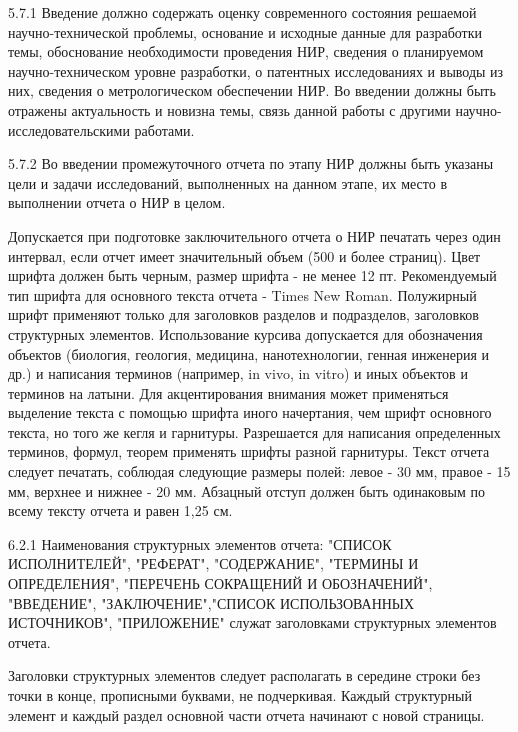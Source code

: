 



\tableofcontents


5.7.1 Введение должно содержать оценку современного состояния решаемой
научно-технической проблемы, основание и исходные данные для разработки темы,
обоснование необходимости проведения НИР, сведения о планируемом
научно-техническом уровне разработки, о патентных исследованиях и выводы из
них, сведения о метрологическом обеспечении НИР. Во введении должны быть
отражены актуальность и новизна темы, связь данной работы с другими
научно-исследовательскими работами.

5.7.2 Во введении промежуточного отчета по этапу НИР должны быть указаны цели и
задачи исследований, выполненных на данном этапе, их место в выполнении отчета
о НИР в целом.


Допускается при подготовке заключительного отчета о НИР печатать через один
интервал, если отчет имеет значительный объем (500 и более страниц). Цвет
шрифта должен быть черным, размер шрифта - не менее 12 пт.  Рекомендуемый тип
шрифта для основного текста отчета - Times New Roman. Полужирный шрифт
применяют только для заголовков разделов и подразделов, заголовков структурных
элементов. Использование курсива допускается для обозначения объектов
(биология, геология, медицина, нанотехнологии, генная инженерия и др.) и
написания терминов (например, in vivo, in vitro) и иных объектов и терминов на
латыни.  Для акцентирования внимания может применяться выделение текста с
помощью шрифта иного начертания, чем шрифт основного текста, но того же кегля и
гарнитуры. Разрешается для написания определенных терминов, формул, теорем
применять шрифты разной гарнитуры. Текст отчета следует печатать, соблюдая
следующие размеры полей: левое - 30 мм, правое - 15 мм, верхнее и нижнее - 20
мм. Абзацный отступ должен быть одинаковым по всему тексту отчета и равен 1,25
см.

6.2.1 Наименования структурных элементов отчета: "СПИСОК ИСПОЛНИТЕЛЕЙ",
"РЕФЕРАТ", "СОДЕРЖАНИЕ", "ТЕРМИНЫ И ОПРЕДЕЛЕНИЯ", "ПЕРЕЧЕНЬ СОКРАЩЕНИЙ И
ОБОЗНАЧЕНИЙ", "ВВЕДЕНИЕ", "ЗАКЛЮЧЕНИЕ",\newline"СПИСОК ИСПОЛЬЗОВАННЫХ ИСТОЧНИКОВ",
"ПРИЛОЖЕНИЕ" служат заголовками структурных элементов отчета.

Заголовки структурных элементов следует располагать в середине строки без точки
в конце, прописными буквами, не подчеркивая. Каждый структурный элемент и
каждый раздел основной части отчета начинают с новой страницы.

